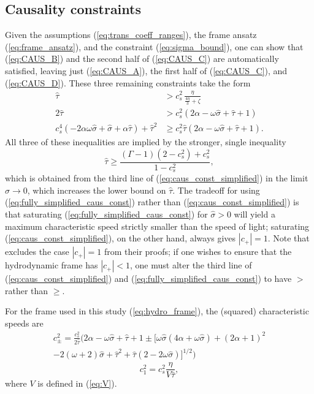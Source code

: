 \documentclass[%
notitlepage,
superscriptaddress,
nofootinbib,
amsmath,
amssymb,
aps,
twocolumn
]{revtex4-1}
\begin{document}
\subsection{Causality constraints}
Given the assumptions (\ref{eq:trans_coeff_ranges}), the frame ansatz (\ref{eq:frame_ansatz}), and the constraint (\ref{eq:sigma_bound}), one can show that (\ref{eq:CAUS_B}) and the second half of (\ref{eq:CAUS_C}) are automatically satisfied, leaving just (\ref{eq:CAUS_A}), the first half of (\ref{eq:CAUS_C}), and (\ref{eq:CAUS_D}).  These three remaining constraints take the form
\begin{equation} \label{eq:caus_const_simplified}
\begin{aligned}
\hat{\tau} &> c_s^2 \, \frac{\eta}{\frac{4 \eta}{3} + \zeta} \\
2 \hat{\tau} &> c_s^2 (2 \alpha - \omega \hat{\sigma} + \hat{\tau} + 1) \\
c_s^4 (-2 \alpha \omega \hat{\sigma} + \hat{\sigma} + \alpha \hat{\tau}) + \hat{\tau}^2 &\geq c_s^2 \hat{\tau} (2 \alpha - \omega \hat{\sigma} + \hat{\tau} + 1).
\end{aligned}
\end{equation}
All three of these inequalities are implied by the stronger, single inequality
\begin{equation} \label{eq:fully_simplified_caus_const}
\hat{\tau} \geq \frac{(\Gamma - 1)(2 - c_s^2) + c_s^2}{1 - c_s^2},
\end{equation}
which is obtained from the third line of (\ref{eq:caus_const_simplified}) in the limit ${\sigma \to 0}$, which increases the lower bound on $\hat{\tau}$.  The tradeoff for using (\ref{eq:fully_simplified_caus_const}) rather than (\ref{eq:caus_const_simplified}) is that saturating (\ref{eq:fully_simplified_caus_const}) for $\hat{\sigma} > 0$ will yield a maximum characteristic speed strictly smaller than the speed of light; saturating (\ref{eq:caus_const_simplified}), on the other hand, always gives $|c_+| = 1$.  Note that \cite{Bemfica:2020zjp} excludes the case $|c_+| = 1$ from their proofs; if one wishes to ensure that the hydrodynamic frame has $|c_+| < 1$, one must alter the third line of (\ref{eq:caus_const_simplified}) and (\ref{eq:fully_simplified_caus_const}) to have $>$ rather than $\geq$.

For the frame used in this study (\ref{eq:hydro_frame}), the (squared) characteristic speeds are
\begin{multline} \label{eq:cpmsq}
c_{\pm}^{2} = \frac{c_s^2}{2 \hat{\tau}} \Big(2 \alpha -\omega  \hat{\sigma} + \hat{\tau} + 1 \pm \Big[ \omega \hat{\sigma} (4 \alpha +\omega  \hat{\sigma})+(2 \alpha +1)^2 \\
- 2 (\omega +2) \hat{\sigma}+\hat{\tau}^2+\hat{\tau} (2-2 \omega  \hat{\sigma})\Big]^{1/2} \Big)
\end{multline}
\begin{equation} \label{eq:c1sq}
c_{1}^{2} = c_s^2 \frac{\eta}{V \hat{\tau}},
\end{equation}
where $V$ is defined in (\ref{eq:V}).
\end{document}
